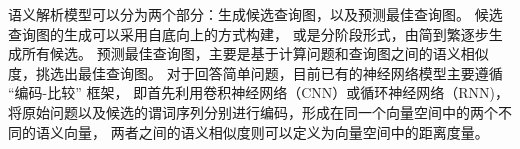 %
%





语义解析模型可以分为两个部分：生成候选查询图，以及预测最佳查询图。
候选查询图的生成可以采用自底向上的方式构建\cite{berant2013semantic,berant2014semantic}，
或是分阶段形式，由简到繁逐步生成所有候选\cite{yih2015semantic,bao2016constraint}。
预测最佳查询图，主要是基于计算问题和查询图之间的语义相似度，挑选出最佳查询图。
对于回答简单问题，目前已有的神经网络模型主要遵循 ``{编码-比较}'' 框架，
即首先利用卷积神经网络（CNN）或循环神经网络（RNN)，
将原始问题以及候选的谓词序列分别进行编码，形成在同一个向量空间中的两个不同的语义向量，
两者之间的语义相似度则可以定义为向量空间中的距离度量。

